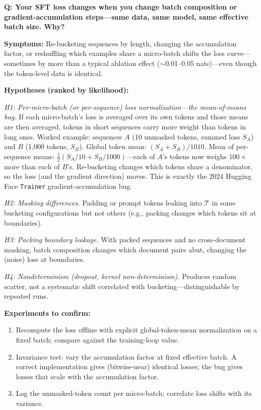 \begin{interviewq}
\textbf{Q: Your SFT loss changes when you change batch composition or gradient-accumulation steps---same data, same model, same effective batch size. Why?}

 \quad {} \quad \badgefreq{\freqhigh}

\stronganswer

\textbf{Symptoms:} Re-bucketing sequences by length, changing the accumulation factor, or reshuffling which examples share a micro-batch shifts the loss curve---sometimes by more than a typical ablation effect ($\sim$0.01--0.05 nats)---even though the token-level data is identical.

\textbf{Hypotheses (ranked by likelihood):}

\textit{H1: Per-micro-batch (or per-sequence) loss normalization---the mean-of-means bug.} If each micro-batch's loss is averaged over its own tokens and those means are then averaged, tokens in short sequences carry more weight than tokens in long ones. Worked example: sequences $A$ (10 unmasked tokens, summed loss $S_A$) and $B$ (1{,}000 tokens, $S_B$). Global token mean: $(S_A + S_B)/1010$. Mean of per-sequence means: $\frac{1}{2}(S_A/10 + S_B/1000)$---each of $A$'s tokens now weighs $100\times$ more than each of $B$'s. Re-bucketing changes which tokens share a denominator, so the loss (and the gradient direction) moves. This is exactly the 2024 Hugging Face \texttt{Trainer} gradient-accumulation bug.

\textit{H2: Masking differences.} Padding or prompt tokens leaking into $\mathcal{T}$ in some bucketing configurations but not others (e.g., packing changes which tokens sit at boundaries).

\textit{H3: Packing boundary leakage.} With packed sequences and no cross-document masking, batch composition changes which document pairs abut, changing the (noise) loss at boundaries.

\textit{H4: Nondeterminism (dropout, kernel non-determinism).} Produces random scatter, not a systematic shift correlated with bucketing---distinguishable by repeated runs.

\textbf{Experiments to confirm:}
\begin{enumerate}
    \item Recompute the loss offline with explicit global-token-mean normalization on a fixed batch; compare against the training-loop value.
    \item Invariance test: vary the accumulation factor at fixed effective batch. A correct implementation gives (bitwise-near) identical losses; the bug gives losses that scale with the accumulation factor.
    \item Log the unmasked-token count per micro-batch; correlate loss shifts with its variance.
\end{enumerate}


\end{interviewq}

